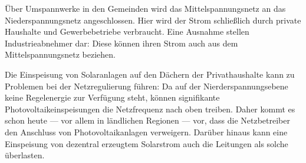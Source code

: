 \documentclass[12pt,BCOR=8.5mm]{scrartcl}
\begin{document}
\begin{enumerate}
    Über Umspannwerke in den Gemeinden wird das Mittelspannungsnetz an
    das Niederspannungsnetz angeschlossen. Hier wird der Strom
    schließlich durch private Haushalte und Gewerbebetriebe verbraucht.
    Eine Ausnahme stellen Industrieabnehmer dar: Diese können ihren
    Strom auch aus dem Mittelspannungsnetz beziehen.

    Die Einspeisung von Solaranlagen auf den Dächern der Privathaushalte
    kann zu Problemen bei der Netzregulierung führen: Da auf der
    Nierderspannungsebene keine Regelenergie zur Verfügung steht, können
    signifikante Photovoltaikeinspeisungen die Netzfrequenz nach oben
    treiben. Daher kommt es schon heute --- vor allem in ländlichen
    Regionen --- vor, dass die Netzbetreiber den Anschluss von
    Photovoltaikanlagen verweigern. Darüber hinaus kann eine Einspeisung
    von dezentral erzeugtem Solarstrom auch die Leitungen als solche
    überlasten.
   

\end{enumerate}
\end{document}
